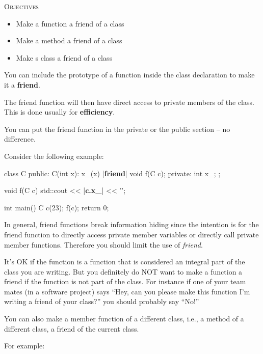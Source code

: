 \newpage{}

\textsc{Objectives}
\begin{itemize}
\item Make a function a friend of a class
\item Make a method a friend of a class
\item Make s class a friend of a class
\end{itemize}


\newpage{}

You can include the prototype of a function inside the class declaration
to make it a \textbf{friend}.

The friend function will then have direct access to private members of
the class. This is done usually for \textbf{efficiency}.

You can put the friend function in the private or the public section --
no difference.

Consider the following example:

\begin{consolethree}[escapeinside=||]
class C
{
public:
    C(int x):
        x_(x)
    {}
    |{\bf friend}| void f(C c);
private:
    int x_;
};

void f(C c)
{
    std::cout << |{\bf c.x\_}| << '\n';
}

int main()
{
    C c(23);
    f(c);
    return 0;
}
\end{consolethree}


In general, friend functions break information hiding since the
intention is for the friend function to directly access private member
variables or directly call private member functions. Therefore you
should limit the use of \textit{friend}.

It's OK if the function is a function that is considered an integral
part of the class you are writing. But you definitely do NOT want to
make a function a friend if the function is not part of the class. For
instance if one of your team mates (in a software project) says ``Hey,
can you please make this function I'm writing a friend of your class?''
you should probably say ``No!''


\newpage{}

You can also make a member function of a different class, i.e., a method
of a different class, a friend of the current class.

For example:

